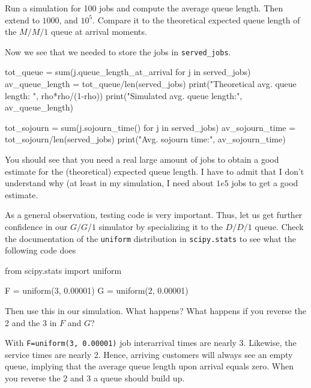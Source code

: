 \documentclass{scrartcl}
\begin{document}
\begin{exercise}
  Run a simulation for 100 jobs and compute the average queue length. Then extend to $1000$, and $10^5$. Compare it to the theoretical expected queue length of the $M/M/1$ queue at arrival moments. 
  \begin{solution}
Now we see that we needed to store the jobs in \texttt{served\_jobs}.

    \begin{pyblock}

tot_queue = sum(j.queue_length_at_arrival for j in served_jobs)
av_queue_length = tot_queue/len(served_jobs)
print("Theoretical avg. queue length: ", rho*rho/(1-rho))
print("Simulated avg. queue length:", av_queue_length)
      
tot_sojourn = sum(j.sojourn_time() for j in served_jobs)
av_sojourn_time = tot_sojourn/len(served_jobs)
print("Avg. sojourn time:", av_sojourn_time)
\end{pyblock}

You should see that you need a real large amount of jobs to obtain a good estimate for the (theoretical) expected queue length. I have to admit that I don't understand why (at least in my simulation, I need about $1e5$ jobs to get a good estimate. 

  \end{solution}
\end{exercise}

\begin{exercise}
  As a general observation, testing code is very important. Thus, let us get further confidence in our $G/G/1$ simulator by specializing it to the $D/D/1$ queue. Check the documentation of the \texttt{uniform} distribution in \texttt{scipy.stats} to see what the following code does
  \begin{pyblock}
from scipy.stats import uniform

F = uniform(3, 0.00001)
G = uniform(2, 0.00001)
\end{pyblock}

Then use this in our simulation. What happens? What happens if you reverse the 2 and the 3 in $F$ and $G$?
\begin{solution}
  With \texttt{F=uniform(3, 0.00001)} job interarrival times are nearly 3. Likewise, the service times are nearly 2. Hence, arriving customers will always see an empty queue, implying that the average queue length upon arrival equals zero. When you reverse the 2 and 3 a queue should build up. 
\end{solution}
\end{exercise}
\end{document}
